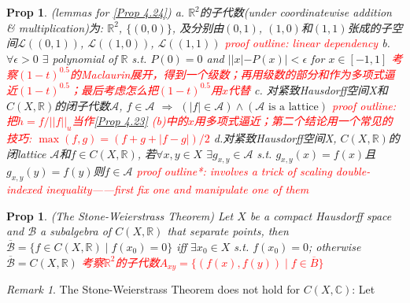 \documentclass[hidelinks]{article}
\theoremstyle{definition}
\theoremstyle{plain}
\newtheorem{proposition}[theorem]{Prop}
\theoremstyle{remark}
\newtheorem*{remark}{Remark}
\begin{document}
\begin{proposition}\label{Prop 4.23} (lemmas for \autoref{Prop 4.24}) \newline
a. $\mathbb{R}^2$的子代数(under coordinatewise addition \& multiplication)为: $\mathbb{R}^2$, $\{(0,0)\}$, 及分别由$(0,1)$, $(1,0)$和$(1,1)$张成的子空间$\mathscr{L}((0,1))$, $\mathscr{L}((1,0))$, $\mathscr{L}((1,1))$ \newline
\textcolor{red}{proof outline: linear dependency} \newline
b. $\forall \epsilon>0$ $\exists$ polynomial of $\mathbb{R}$ s.t. $P(0)=0$ and $||x|-P(x)|<\epsilon$ for $x\in [-1,1]$ \newline
\textcolor{red}{考察$(1-t)^{0.5}$的Maclaurin展开，得到一个级数；再用级数的部分和作为多项式逼近$(1-t)^{0.5}$；最后考虑怎么把$(1-t)^{0.5}$用$x$代替} \newline
c. 对紧致Hausdorff空间X和$C(X,\mathbb{R})$的闭子代数$\mathscr{A}$, $f\in \mathscr{A}$ $\Rightarrow$ $(|f|\in \mathscr{A})\wedge(\mathscr{A}\textrm{ is a lattice})$ \newline
\textcolor{red}{proof outline: 把$h=f/||f||_u$当作\autoref{Prop 4.23} (b)中的$x$用多项式逼近；第二个结论用一个常见的技巧: $\max(f,g)=(f+g+|f-g|)/2$} \newline
d.对紧致Hausdorff空间X, $C(X,\mathbb{R})$的闭lattice $\mathscr{A}$和$f\in C(X,\mathbb{R})$, 若$\forall x,y\in X$ $\exists g_{x,y}\in \mathscr{A}$ s.t. $g_{x,y}(x)=f(x)$且$g_{x,y}(y)=f(y)$则$f\in \mathscr{A}$\newline
\textcolor{red}{proof outline*: involves a trick of scaling double-indexed inequality——first fix one and manipulate one of them}
\end{proposition}

\begin{proposition}\label{Prop 4.24} (The Stone-Weierstrass Theorem) \newline
Let $X$ be a compact Hausdorff space and $\mathscr{B}$ a subalgebra of $C(X,\mathbb{R})$ that separate points, then $\overline{\mathscr{B}}=\{f\in C(X,\mathbb{R})\mid f(x_0)=0\}$ iff $\exists x_0\in X$ s.t. $f(x_0)=0$; otherwise $\overline{\mathscr{B}}=C(X,\mathbb{R})$ \newline
\textcolor{red}{考察$\mathbb{R}^2$的子代数$A_{xy}=\{(f(x),f(y))\mid f\in \overline{B}\}$}
\end{proposition}

\begin{remark}
The Stone-Weierstrass Theorem does not hold for $C(X,\mathbb{C})$: Let
\end{remark}
\end{document}
